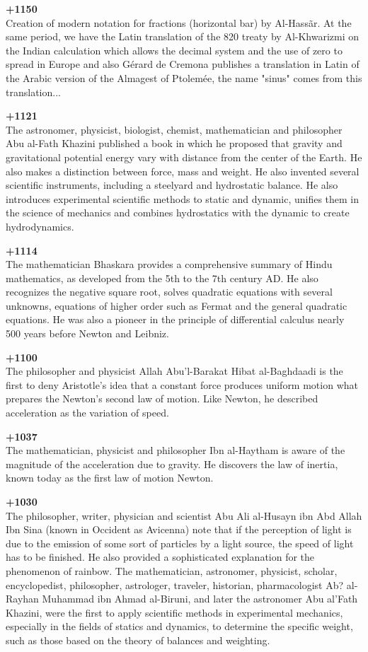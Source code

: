 \textbf{+1150}\\
Creation of modern notation for fractions (horizontal bar) by Al-Hassãr. At the same period, we have the Latin translation of the 820 treaty by Al-Khwarizmi on the Indian calculation which allows the decimal system and the use of zero to spread in Europe and also Gérard de Cremona publishes a translation in Latin of the Arabic version of the Almagest of Ptolemée, the name "sinus" comes from this translation...

\textbf{+1121}\\
The astronomer, physicist, biologist, chemist, mathematician and philosopher Abu al-Fath Khazini published a book in which he proposed that gravity and gravitational potential energy vary with distance from the center of the Earth. He also makes a distinction between force, mass and weight. He also invented several scientific instruments, including a steelyard and hydrostatic balance. He also introduces experimental scientific methods to static and dynamic, unifies them in the science of mechanics and combines hydrostatics with the dynamic to create hydrodynamics.

\textbf{+1114}\\
The mathematician Bhaskara provides a comprehensive summary of Hindu mathematics, as developed from the 5th to the 7th century AD. He also recognizes the negative square root, solves quadratic equations with several unknowns, equations of higher order such as Fermat and the general quadratic equations. He was also a pioneer in the principle of differential calculus nearly 500 years before Newton and Leibniz.

\textbf{+1100}\\
The philosopher and physicist Allah Abu'l-Barakat Hibat al-Baghdaadi is the first to deny Aristotle's idea that a constant force produces uniform motion what prepares the Newton's second law of motion. Like Newton, he described acceleration as the variation of speed.

\textbf{+1037}\\
The mathematician, physicist and philosopher Ibn al-Haytham is aware of the magnitude of the acceleration due to gravity. He discovers the law of inertia, known today as the first law of motion Newton.

\textbf{+1030}\\
The philosopher, writer, physician and scientist Abu Ali al-Husayn ibn Abd Allah Ibn Sina (known in Occident as Avicenna) note that if the perception of light is due to the emission of some sort of particles by a light source, the speed of light has to be finished. He also provided a sophisticated explanation for the phenomenon of rainbow. The mathematician, astronomer, physicist, scholar, encyclopedist, philosopher, astrologer, traveler, historian, pharmacologist Ab? al-Rayhan Muhammad ibn Ahmad al-Biruni, and later the astronomer Abu al'Fath Khazini, were the first to apply scientific methods in experimental mechanics, especially in the fields of statics and dynamics, to determine the specific weight, such as those based on the theory of balances and weighting.

